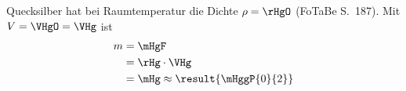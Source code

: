Quecksilber hat bei Raumtemperatur die Dichte $\rho = \rHgO$ (FoTaBe S.~187). Mit $V = \VHgO = \VHg$ ist
\begin{align}
 m &= \mHgF \\
   &= \rHg\cdot\VHg \\
   &= \mHg \approx \result{\mHggP{0}{2}}
\end{align}
